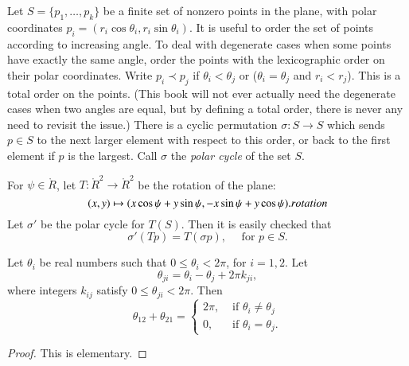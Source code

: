 Let $S=\{p_1,\ldots,p_k\}$ be a finite set of
nonzero points in the plane, with
polar coordinates $p_i = (r_i\cos\theta_i,r_i\sin\theta_i)$.
It is useful to order the set of points according to increasing angle.
To deal with degenerate cases when some points have exactly
the same angle, order the points with the lexicographic order on their
polar coordinates.  Write $p_i \prec p_j$ if
$\theta_i < \theta_j$ or ($\theta_i=\theta_j$ and $r_i<r_j$).
This is a total order on the points.  (This book will not ever
actually need the degenerate cases when two angles are equal,
but by defining a total order,  there is never any need to revisit the issue.)
There is a cyclic permutation $\sigma:S\to S$ which sends
$p\in S$ to the next larger element with respect to this order,
or back to the first element if $p$ is the largest.
Call $\sigma$ the {\it polar cycle}
of the set $S$.




For $\psi\in\ring{R}$, let $T:\ring{R}^2\to\ring{R}^2$ be the
rotation of the plane:
   \begin{equation}
   \label{eqn:rotate}
   (x,y) \mapsto  (x\cos\psi + y\sin\psi,-x\sin\psi+y\cos\psi).
   \indy{Index}{rotation}
   \end{equation}
Let $\sigma'$ be the polar cycle for $T(S)$.  Then it is easily
checked that
$$
   \sigma'(T p) = T (\sigma p),\quad \text{ for } p\in S. 
$$

\begin{lemma}\label{lemma:polar2}
Let $\theta_i$ be real numbers such that $0\le \theta_i < 2\pi$, for $i=1,2$.
Let $$\theta_{ji} = \theta_i - \theta_j + 2\pi k_{ji},$$
where integers $k_{ij}$ satisfy $0\le \theta_{ji}< 2\pi$.
Then 
$$
  \theta_{12} + \theta_{21} = \begin{cases}
    2\pi, & \text{ if }\theta_i\ne\theta_j\\
    0,    & \text{ if }\theta_i=\theta_j.
    \end{cases}
$$
\end{lemma}

\begin{proof} This is elementary.
\end{proof}


